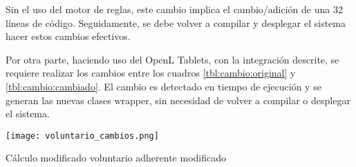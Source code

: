 Sin el uso del motor de reglas, este cambio implica el cambio/adición de una 32 líneas de código. Seguidamente, se debe volver a compilar y desplegar el sistema hacer estos cambios efectivos.

Por otra parte, haciendo uso del OpenL Tablets, con la integración descrite, se requiere realizar los cambios entre los cuadros \ref{tbl:cambio:original} y \ref{tbl:cambio:cambiado}. El cambio es detectado en tiempo de ejecución y se generan las nuevas clases wrapper, sin necesidad de volver a compilar o desplegar el sistema.



\begin{table*}
    \centering
    \texttt{[image: voluntario\_cambios.png]}
    \caption{Cálculo modificado voluntario adherente modificado}
    \label{tbl:cambio:cambiado}
\end{table*}
